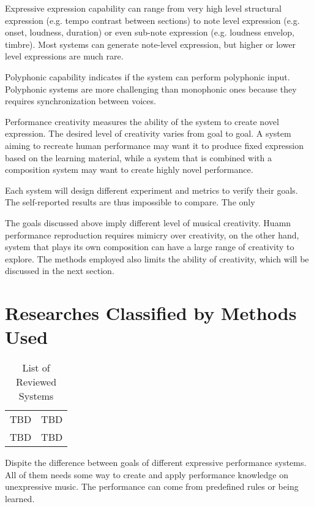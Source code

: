 Expressive expression capability can range from very high level structural expression (e.g. tempo contrast between sections) to note level expression (e.g. onset, loudness, duration) or even sub-note expression (e.g. loudness envelop, timbre). Most systems can generate note-level expression, but higher or lower level expressions are much rare.

Polyphonic capability indicates if the system can perform polyphonic input. Polyphonic systems are more challenging than monophonic ones because they requires synchronization between voices. 

Performance creativity measures the ability of the system to create novel expression. The desired level of creativity varies from goal to goal. A system aiming to recreate human performance may want it to produce fixed expression based on the learning material, while a system that is combined with a composition system may want to create highly novel performance. 

Each system will design different experiment and metrics to verify their goals. The self-reported results are thus impossible to compare. The only 



The goals discussed above imply different level of musical creativity. Huamn performance reproduction requires mimicry over creativity, on the other hand, system that plays its own composition can have a large range of creativity to explore. The methods employed also limits the ability of creativity, which will be discussed in the next section.



\section{Researches Classified by Methods Used}
\begin{table}
   \centering
   \begin{tabular}{|c|c|}
      TBD & TBD\\
      TBD & TBD\\
   \end{tabular}
   \caption{List of Reviewed Systems}
   \label{tab:prevworks}
\end{table}
Dispite the difference between goals of different expressive performance systems. All of them needs some way to create and apply performance knowledge on unexpressive music. The performance can come from predefined rules or being learned. 

